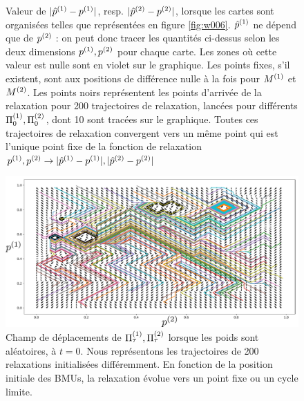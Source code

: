 \documentclass[../main]{subfiles}
\begin{document}
\begin{figure}
\begin{minipage}{0.5\textwidth}
\end{minipage}
\caption{Valeur de $\lvert{\hat{p}}^{({1})} - p^{({1})}\rvert$, resp. $\lvert{\hat{p}}^{({2})} - p^{({2})}\rvert$, lorsque les cartes sont organisées telles que représentées en figure \ref{fig:w006}. 
${\hat{p}}^{({1})}$ ne dépend que de $p^{({2})}$ : on peut donc tracer les quantités ci-dessus selon les deux dimensions $p^{({1})}, p^{({2})}$ pour chaque carte. Les zones où cette valeur est nulle sont en violet sur le graphique. Les points fixes, s'il existent, sont aux positions de différence nulle à la fois pour $M^{({1})}$ et $M^{({2})}$. Les points noirs représentent les points d'arrivée de la relaxation pour 200 trajectoires de relaxation, lancées pour différents $\Pi_0^{({1})}, \Pi_0^{({2})}$, dont 10 sont tracées sur le graphique. Toutes ces trajectoires de relaxation convergent vers un même point qui est l'unique point fixe de la fonction de relaxation $p^{({1})}, p^{({2})} \rightarrow \lvert{\hat{p}}^{({1})} - p^{({1})}\rvert, \lvert{\hat{p}}^{({2})} - p^{({2})}\rvert$
\label{fig:diff_relax_notraj}}
\end{figure}

\begin{figure}
\centering
\includegraphics[width=\textwidth]{champ_006_t1.pdf}
\caption{Champ de déplacements de $\Pi^{({1})}_\tau,\Pi^{({2})}_\tau$ lorsque les poids sont aléatoires, à $t=0$. Nous représentons les trajectoires de 200 relaxations initialisées différemment. En fonction de la position initiale des BMUs, la relaxation évolue vers un point fixe ou un cycle limite.}
\label{fig:champ_0}
\end{figure}
\end{document}
